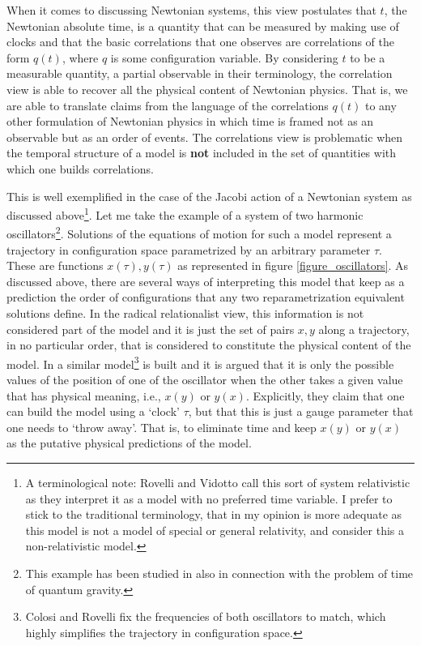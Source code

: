 \documentclass[12 pt]{article}
\begin{document}
When it comes to discussing Newtonian systems, this view postulates that $t$, the Newtonian absolute time, is a quantity that can be measured by making use of clocks and that the basic correlations that one observes are correlations of the form $q(t)$, where $q$ is some configuration variable. By considering $t$ to be a measurable quantity, a partial observable in their terminology, the correlation view is able to recover all the physical content of Newtonian physics. That is, we are able to translate claims from the language of the correlations $q(t)$ to any other formulation of Newtonian physics in which time is framed not as an observable but as an order of events. The correlations view is problematic when the temporal structure of a model is \textbf{not} included in the set of quantities with which one builds correlations.

This is well exemplified in the case of the Jacobi action of a Newtonian system as discussed above\footnote{A terminological note: Rovelli and Vidotto call this sort of system relativistic as they interpret it as a model with no preferred time variable. I prefer to stick to the traditional terminology, that in my opinion is more adequate as this model is not a model of special or general relativity, and consider this a non-relativistic model.}. Let me take the example of a system of two harmonic oscillators\footnote{This example has been studied in \citep{MozotaFrauca2023} also in connection with the problem of time of quantum gravity.}. Solutions of the equations of motion for such a model represent a trajectory in configuration space parametrized by an arbitrary parameter $\tau$. These are functions $x(\tau),y(\tau)$ as represented in figure \ref{figure_oscillators}. As discussed above, there are several ways of interpreting this model that keep as a prediction the order of configurations that any two reparametrization equivalent solutions define. In the radical relationalist view, this information is not considered part of the model and it is just the set of pairs $x,y$ along a trajectory, in no particular order, that is considered to constitute the physical content of the model. In \cite{Colosi2003,Rovelli2004} a similar model\footnote{Colosi and Rovelli fix the frequencies of both oscillators to match, which highly simplifies the trajectory in configuration space.} is built and it is argued that it is only the possible values of the position of one of the oscillator when the other takes a given value that has physical meaning, i.e., $x(y)$ or $y(x)$. Explicitly, they claim that one can build the model using a `clock' $\tau$, but that this is just a gauge parameter that one needs to `throw away'. That is, to eliminate time and keep $x(y)$ or $y(x)$ as the putative physical predictions of the model.
\end{document}
